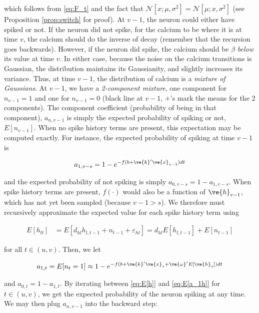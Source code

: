 \noindent which follows from \eqref{eq:F_t} and the fact that $\mathcal{N}[x;\mu,\sigma^2]=\mathcal{N}[\mu;x,\sigma^2]$ (see Proposition \ref{prop:switch} for proof).  At $v-1$, the neuron could either have spiked or not.  If the neuron did not spike, for the calcium to be where it is at time $v$, the calcium should do the inverse of decay (remember that the recursion goes backwards).  However, if the neuron did spike, the calcium should be $\beta$ \emph{below} its value at time $v$.  In either case, because the noise on the calcium transitions is Gaussian, the distribution maintains its Gaussianity, and slightly increases its variance.  Thus, at time $v-1$, the distribution of calcium is a \emph{mixture of Gaussians}.  At $v-1$, we have a \emph{2-component mixture}, one component for $n_{v-1}=1$ and one for $n_{v-1}=0$ (black line at $v-1$, $+$'s mark the means for the 2 components). The component coefficient (probability of being in that component), $a_{n,v-1}$ is simply the expected probability of spiking or not, $E[n_{v-1}]$. When no spike history terms are present, this expectation may be computed exactly.  For instance, the expected probability of spiking at time $v-1$ is

\begin{align} \label{eq:E[a_1]}
a_{1,v-s} = 1-e^{-f(b+\ve{k}'\ve{x}_{v-1})dt}
\end{align}

\noindent and the expected probability of not spiking is simply $a_{0,v-s}=1-a_{1,v-s}$.  When spike history terms are present, $f(\cdot)$ would also be a function of $\ve{h}_{v-1}$, which has not yet been sampled (because $v-1>s$).  We therefore must recursively approximate the expected value for each spike history term using

\begin{align} \label{eq:E[h]}
E[h_{lt}] &= E[d_{hl} h_{l,t-1} + n_{t-1} + \varepsilon_{ht}] = d_{hl} E[h_{l,t-1}] + E[n_{t-1}]
\end{align}

\noindent for all $t\in(u,v)$. Then, we let

\begin{align} \label{eq:E[a_1h]}
a_{1,t} = E[n_{t}=1] \approx 1-e^{-f(b+\ve{k}'\ve{x}_s + \ve{\omega}'E[\ve{h}_s])dt}
\end{align}

\noindent and $a_{0,t}=1-a_{1,t}$. By iterating between \eqref{eq:E[h]} and \eqref{eq:E[a_1h]} for $t\in(u,v)$, we get the expected probability of the neuron spiking at any time.  We may then plug $a_{n,v-1}$ into the backward step:


